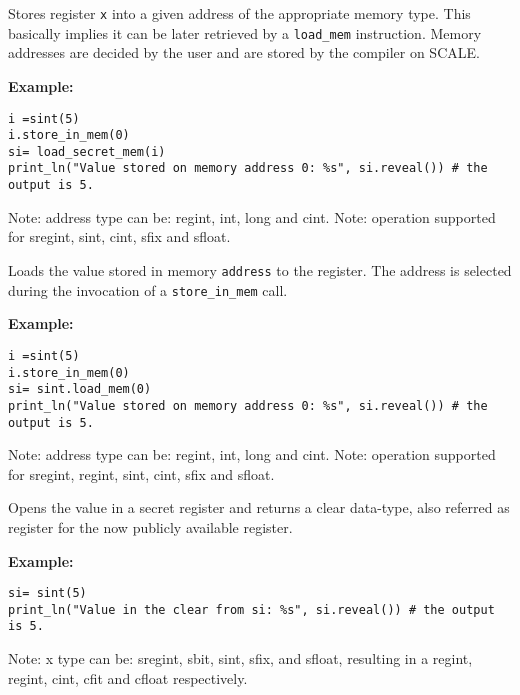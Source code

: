 Stores register \verb|x| into a given address
of the appropriate memory type. This basically implies it can be later retrieved by a \verb|load_mem| instruction. Memory addresses are decided by the user and are  stored by the compiler on SCALE.

\noindent
\textbf{Example:}
\begin{lstlisting}
i =sint(5)
i.store_in_mem(0)
si= load_secret_mem(i)
print_ln("Value stored on memory address 0: %s", si.reveal()) # the output is 5.
\end{lstlisting}
\begin{footnotesize}
  Note: address type can be: regint, int, long and cint.
  Note: operation supported for sregint, sint, cint, sfix and sfloat.
\end{footnotesize}

Loads the value stored in memory \verb|address| to the register.
The address is selected during the invocation of a \verb|store_in_mem| call.

\noindent
\textbf{Example:}
\begin{lstlisting}
i =sint(5)
i.store_in_mem(0)
si= sint.load_mem(0)
print_ln("Value stored on memory address 0: %s", si.reveal()) # the output is 5.
\end{lstlisting}
\begin{footnotesize}
  Note: address type can be: regint, int, long and cint.
  Note: operation supported for sregint, regint, sint, cint, sfix and sfloat.
\end{footnotesize}

Opens the value in a secret register and returns a clear data-type,
also referred as register for the now publicly available register.

\noindent
\textbf{Example:}
\begin{lstlisting}
si= sint(5)
print_ln("Value in the clear from si: %s", si.reveal()) # the output is 5.
\end{lstlisting}
\begin{footnotesize}
  Note: x type can be: sregint, sbit, sint, sfix, and sfloat, resulting in a
  regint, regint, cint, cfit and cfloat respectively.
\end{footnotesize}

